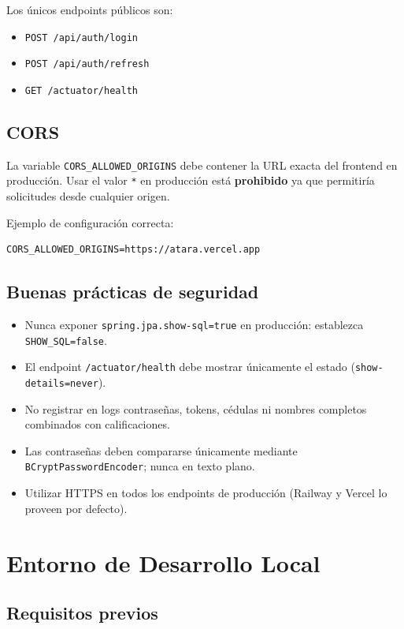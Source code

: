 \documentclass[11pt, a4paper]{article}
\begin{document}
Los únicos endpoints públicos son:
\begin{itemize}
  \item \texttt{POST /api/auth/login}
  \item \texttt{POST /api/auth/refresh}
  \item \texttt{GET /actuator/health}
\end{itemize}

\subsection{CORS}

La variable \texttt{CORS\_ALLOWED\_ORIGINS} debe contener la URL exacta del frontend en producción. Usar el valor \texttt{*} en producción está \textbf{prohibido} ya que permitiría solicitudes desde cualquier origen.

Ejemplo de configuración correcta:
\begin{lstlisting}
CORS_ALLOWED_ORIGINS=https://atara.vercel.app
\end{lstlisting}

\subsection{Buenas prácticas de seguridad}

\begin{itemize}
  \item Nunca exponer \texttt{spring.jpa.show-sql=true} en producción: establezca \texttt{SHOW\_SQL=false}.
  \item El endpoint \texttt{/actuator/health} debe mostrar únicamente el estado (\texttt{show-details=never}).
  \item No registrar en logs contraseñas, tokens, cédulas ni nombres completos combinados con calificaciones.
  \item Las contraseñas deben compararse únicamente mediante \texttt{BCryptPasswordEncoder}; nunca en texto plano.
  \item Utilizar HTTPS en todos los endpoints de producción (Railway y Vercel lo proveen por defecto).
\end{itemize}

\section{Entorno de Desarrollo Local}

\subsection{Requisitos previos}
\end{document}
